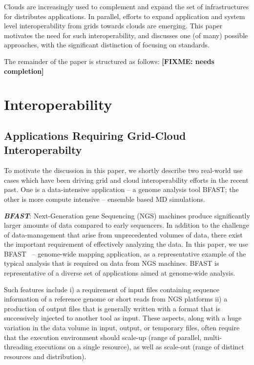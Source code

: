 \documentclass[10pt,conference,final,letterpaper,twoside,twocolumn,]{IEEEtran}
\newcommand{\I}[1]{\textit{#1}}
\newcommand{\B}[1]{\textbf{#1}}
\newcommand{\BI}[1]{\B{\I{#1}}}
\newcommand{\F}[1]{\B{[FIXME: #1]}}
\begin{document}
 Clouds are increasingly used to complement and expand the set of
 infrastructures for distributes applications.  In parallel, efforts
 to expand application and system level interoperability from grids
 towards clouds are emerging.  This paper motivates the need for such
 interoperability, and discusses one (of many) possible approaches,
 with the significant distinction of focusing on standards.

 The remainder of the paper is structured as follows: \F{needs
 completion}


\section{Interoperability}
\label{sec:interop}

 \subsection*{Applications Requiring Grid-Cloud Interoperabilty}

 To motivate the discussion in this paper, we shortly describe two
 real-world use cases which have been driving grid and cloud
 interoperability efforts in the recent past.  One is a data-intensive
 application -- a genome analysis tool BFAST; the other is more
 compute intensive -- ensemble based MD simulations.
 
 \BI{BFAST}: Next-Generation gene Sequencing (NGS) machines produce
 significantly larger amounts of data compared to early sequencers.
 In addition to the challenge of data-management that arise from
 unprecedented volumes of data, there exist the important requirement
 of effectively analyzing the data.  In this paper, we use
 BFAST~\cite{bfast2009,bfast2009b} -- genome-wide mapping application,
 as a representative example of the typical analysis that is required
 on data from NGS machines.  BFAST is representative of a diverse set
 of applications aimed at genome-wide analysis.
 
 Such features include i) a requirement of input files containing
 sequence information of a reference genome or short reads from NGS
 platforms ii) a production of output files that is generally written
 with a format that is successively injected to another tool as input.
 These aspects, along with a huge variation in the data volume in
 input, output, or temporary files, often require that the execution
 environment should scale-up (range of parallel, multi-threading
 executions on a single resource), as well as scale-out (range of
 distinct resources and distribution).
 
\end{document}
